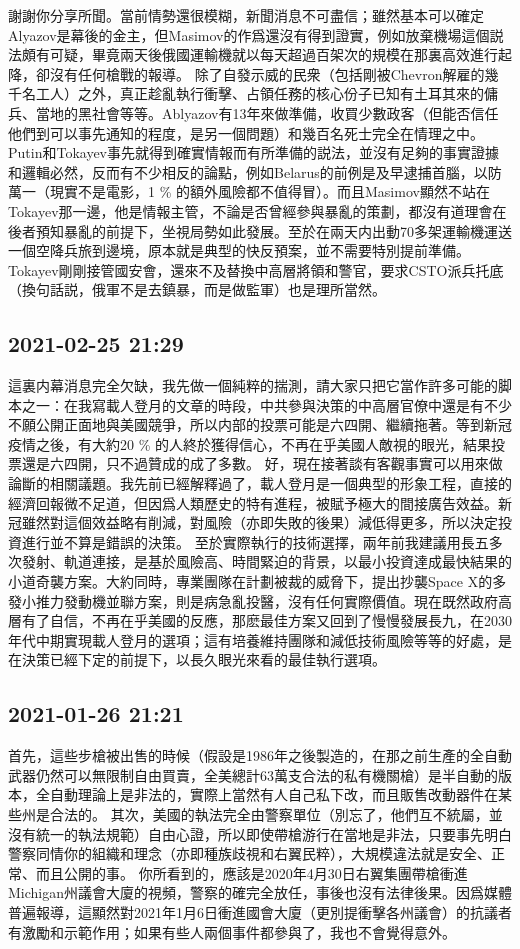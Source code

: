 \documentclass[twocolumn]{ctexart}
\begin{document}
謝謝你分享所聞。當前情勢還很模糊，新聞消息不可盡信；雖然基本可以確定Alyazov是幕後的金主，但Masimov的作爲還沒有得到證實，例如放棄機場這個説法頗有可疑，畢竟兩天後俄國運輸機就以每天超過百架次的規模在那裏高效進行起降，卻沒有任何槍戰的報導。
除了自發示威的民衆（包括剛被Chevron解雇的幾千名工人）之外，真正趁亂執行衝擊、占領任務的核心份子已知有土耳其來的傭兵、當地的黑社會等等。Ablyazov有13年來做準備，收買少數政客（但能否信任他們到可以事先通知的程度，是另一個問題）和幾百名死士完全在情理之中。
Putin和Tokayev事先就得到確實情報而有所準備的説法，並沒有足夠的事實證據和邏輯必然，反而有不少相反的論點，例如Belarus的前例是及早逮捕首腦，以防萬一（現實不是電影，1 \% 的額外風險都不值得冒）。而且Masimov顯然不站在Tokayev那一邊，他是情報主管，不論是否曾經參與暴亂的策劃，都沒有道理會在後者預知暴亂的前提下，坐視局勢如此發展。至於在兩天内出動70多架運輸機運送一個空降兵旅到邊境，原本就是典型的快反預案，並不需要特別提前準備。Tokayev剛剛接管國安會，還來不及替換中高層將領和警官，要求CSTO派兵托底（換句話説，俄軍不是去鎮暴，而是做監軍）也是理所當然。
\subsection*{2021-02-25 21:29}

這裏内幕消息完全欠缺，我先做一個純粹的揣測，請大家只把它當作許多可能的脚本之一：在我寫載人登月的文章的時段，中共參與決策的中高層官僚中還是有不少不願公開正面地與美國競爭，所以内部的投票可能是六四開、繼續拖著。等到新冠疫情之後，有大約20 \% 的人終於獲得信心，不再在乎美國人敵視的眼光，結果投票還是六四開，只不過贊成的成了多數。
好，現在接著談有客觀事實可以用來做論斷的相關議題。我先前已經解釋過了，載人登月是一個典型的形象工程，直接的經濟回報微不足道，但因爲人類歷史的特有進程，被賦予極大的間接廣告效益。新冠雖然對這個效益略有削減，對風險（亦即失敗的後果）減低得更多，所以決定投資進行並不算是錯誤的決策。
至於實際執行的技術選擇，兩年前我建議用長五多次發射、軌道連接，是基於風險高、時間緊迫的背景，以最小投資達成最快結果的小道奇襲方案。大約同時，專業團隊在計劃被裁的威脅下，提出抄襲Space X的多發小推力發動機並聯方案，則是病急亂投醫，沒有任何實際價值。現在既然政府高層有了自信，不再在乎美國的反應，那麽最佳方案又回到了慢慢發展長九，在2030年代中期實現載人登月的選項；這有培養維持團隊和減低技術風險等等的好處，是在決策已經下定的前提下，以長久眼光來看的最佳執行選項。
\subsection*{2021-01-26 21:21}

首先，這些步槍被出售的時候（假設是1986年之後製造的，在那之前生產的全自動武器仍然可以無限制自由買賣，全美總計63萬支合法的私有機關槍）是半自動的版本，全自動理論上是非法的，實際上當然有人自己私下改，而且販售改動器件在某些州是合法的。
其次，美國的執法完全由警察單位（別忘了，他們互不統屬，並沒有統一的執法規範）自由心證，所以即使帶槍游行在當地是非法，只要事先明白警察同情你的組織和理念（亦即種族歧視和右翼民粹），大規模違法就是安全、正常、而且公開的事。
你所看到的，應該是2020年4月30日右翼集團帶槍衝進Michigan州議會大廈的視頻，警察的確完全放任，事後也沒有法律後果。因爲媒體普遍報導，這顯然對2021年1月6日衝進國會大廈（更別提衝擊各州議會）的抗議者有激勵和示範作用；如果有些人兩個事件都參與了，我也不會覺得意外。
\end{document}
